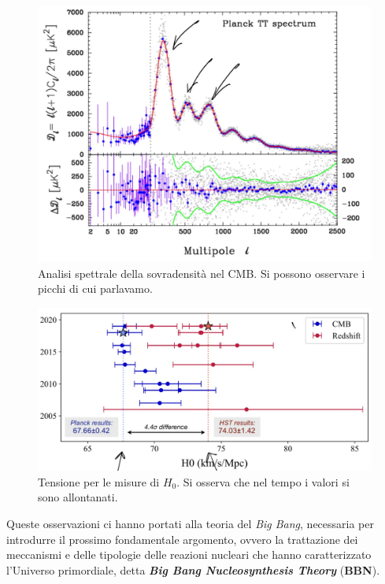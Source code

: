 \begin{itemize}
    \begin{figure}[h]
        \centering
        \includegraphics[scale=0.2]{Immagini/0311_peak.png}
        \caption{Analisi spettrale della sovradensità nel CMB. Si possono osservare i picchi di cui parlavamo.}
        \label{0311_peak}
    \end{figure}
    \begin{figure}[h]
        \centering
        \includegraphics[scale=0.2]{Immagini/0311_peak2.png}
        \caption{Tensione per le misure di $H_0$. Si osserva che nel tempo i valori si sono allontanati.}
        \label{0311_H0}
    \end{figure}
\end{itemize}
\noindent Queste osservazioni ci hanno portati alla teoria del \textit{Big Bang}, necessaria per introdurre il prossimo fondamentale argomento, ovvero la trattazione dei meccanismi e delle tipologie delle reazioni nucleari che hanno caratterizzato l'Universo primordiale, detta \textit{\textbf{Big Bang Nucleosynthesis Theory}} (\textbf{BBN}).


